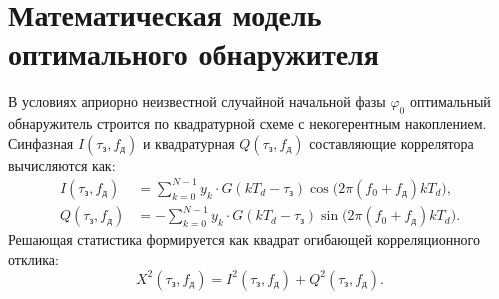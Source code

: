 \section{Математическая модель оптимального обнаружителя}
В условиях априорно неизвестной случайной начальной фазы $\varphi_0$ оптимальный обнаружитель строится по квадратурной схеме с некогерентным накоплением. Синфазная $I(\tau_{\text{з}}, f_{\text{д}})$ и квадратурная $Q(\tau_{\text{з}}, f_{\text{д}})$ составляющие коррелятора вычисляются как:
\begin{align}
I(\tau_{\text{з}}, f_{\text{д}}) &= \sum_{k=0}^{N-1} y_k \cdot G(k T_d - \tau_{\text{з}}) \cos\bigl(2\pi(f_0 + f_{\text{д}}) k T_d\bigr), \\
Q(\tau_{\text{з}}, f_{\text{д}}) &= -\sum_{k=0}^{N-1} y_k \cdot G(k T_d - \tau_{\text{з}}) \sin\bigl(2\pi(f_0 + f_{\text{д}}) k T_d\bigr).
\end{align}
Решающая статистика формируется как квадрат огибающей корреляционного отклика:
\begin{equation}
X^2(\tau_{\text{з}}, f_{\text{д}}) = I^2(\tau_{\text{з}}, f_{\text{д}}) + Q^2(\tau_{\text{з}}, f_{\text{д}}).
\end{equation}

